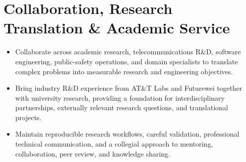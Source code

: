 \documentclass[9pt,letterpaper]{extarticle}
\begin{document}
\section{Collaboration, Research Translation \& Academic Service}
\begin{itemize}
\item Collaborate across academic research, telecommunications R\&D, software engineering, public-safety operations, and domain specialists to translate complex problems into measurable research and engineering objectives.
\item Bring industry R\&D experience from AT\&T Labs and Futurewei together with university research, providing a foundation for interdisciplinary partnerships, externally relevant research questions, and translational projects.
\item Maintain reproducible research workflows, careful validation, professional technical communication, and a collegial approach to mentoring, collaboration, peer review, and knowledge sharing.
\end{itemize}
\end{document}
